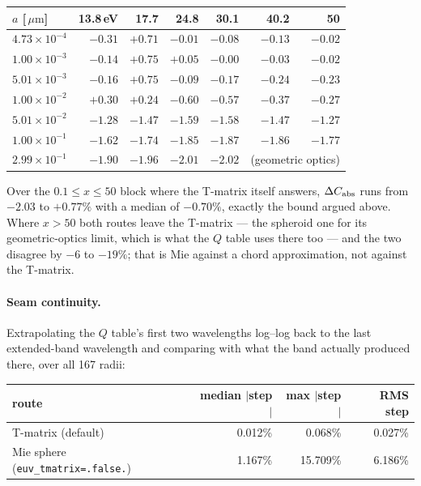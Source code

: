 \documentclass{my_memo}
\newcommand{\code}[1]{\texttt{#1}}
\newcommand{\um}{\ensuremath{\,\mu\mathrm{m}}}
\begin{document}
\begin{center}
\begin{tabular}{@{}lrrrrrr@{}}
\toprule
$a$ [\um] & 13.8\,eV & 17.7 & 24.8 & 30.1 & 40.2 & 50 \\
\midrule
$4.73\times10^{-4}$ & $-0.31$ & $+0.71$ & $-0.01$ & $-0.08$ & $-0.13$ & $-0.02$ \\
$1.00\times10^{-3}$ & $-0.14$ & $+0.75$ & $+0.05$ & $-0.00$ & $-0.03$ & $-0.02$ \\
$5.01\times10^{-3}$ & $-0.16$ & $+0.75$ & $-0.09$ & $-0.17$ & $-0.24$ & $-0.23$ \\
$1.00\times10^{-2}$ & $+0.30$ & $+0.24$ & $-0.60$ & $-0.57$ & $-0.37$ & $-0.27$ \\
$5.01\times10^{-2}$ & $-1.28$ & $-1.47$ & $-1.59$ & $-1.58$ & $-1.47$ & $-1.27$ \\
$1.00\times10^{-1}$ & $-1.62$ & $-1.74$ & $-1.85$ & $-1.87$ & $-1.86$ & $-1.77$ \\
$2.99\times10^{-1}$ & $-1.90$ & $-1.96$ & $-2.01$ & $-2.02$ & \multicolumn{2}{c}{(geometric optics)} \\
\bottomrule
\end{tabular}
\end{center}

\noindent Over the $0.1\le x\le50$ block where the T-matrix itself answers,
$\Delta C_{\rm abs}$ runs from $-2.03$ to $+0.77\%$ with a median of $-0.70\%$,
exactly the bound argued above. Where $x>50$ both routes leave the T-matrix ---
the spheroid one for its geometric-optics limit, which is what the $Q$ table
uses there too --- and the two disagree by $-6$ to $-19\%$; that is Mie against
a chord approximation, not against the T-matrix.

\paragraph{Seam continuity.} Extrapolating the $Q$ table's first two
wavelengths log--log back to the last extended-band wavelength and comparing
with what the band actually produced there, over all 167 radii:

\begin{center}
\begin{tabular}{@{}lrrr@{}}
\toprule
route & median $|$step$|$ & max $|$step$|$ & RMS step \\
\midrule
T-matrix (default)                & 0.012\% & 0.068\%  & 0.027\% \\
Mie sphere (\code{euv\_tmatrix=.false.}) & 1.167\% & 15.709\% & 6.186\% \\
\bottomrule
\end{tabular}
\end{center}
\end{document}
